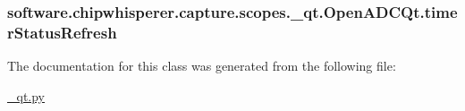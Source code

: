 \hypertarget{classsoftware_1_1chipwhisperer_1_1capture_1_1scopes_1_1__qt_1_1OpenADCQt_ac7abf9f0bc643d10b7cc63c97ee9a8db}{}
\subsubsection[{timer\+Status\+Refresh}]{\setlength{\rightskip}{0pt plus 5cm}software.\+chipwhisperer.\+capture.\+scopes.\+\_\+qt.\+Open\+A\+D\+C\+Qt.\+timer\+Status\+Refresh}\label{classsoftware_1_1chipwhisperer_1_1capture_1_1scopes_1_1__qt_1_1OpenADCQt_ac7abf9f0bc643d10b7cc63c97ee9a8db}


The documentation for this class was generated from the following file\+:\begin{DoxyCompactItemize}
\item 
\hyperlink{__qt_8py}{\+\_\+qt.\+py}\end{DoxyCompactItemize}
